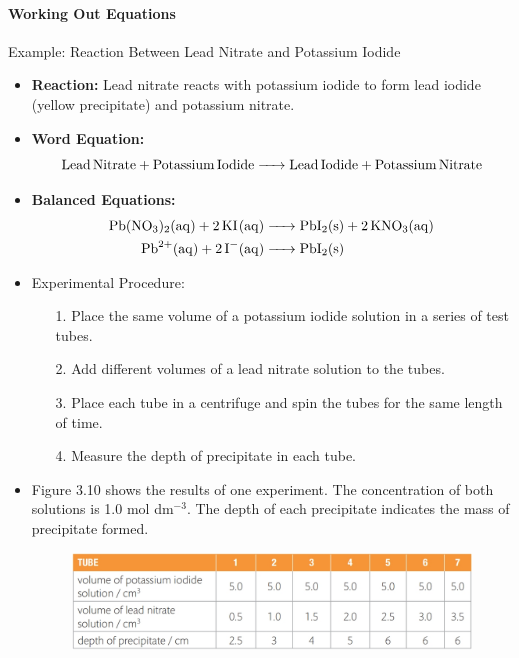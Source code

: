 \paragraph{Working Out Equations}
Example: Reaction Between Lead Nitrate and Potassium Iodide
\begin{itemize}
    \item \textbf{Reaction:} Lead nitrate reacts with potassium iodide to form lead iodide (yellow precipitate) and potassium
    nitrate.
    \item \textbf{Word Equation:}
    \begin{equation}
        \ce{Lead Nitrate + Potassium Iodide -> Lead Iodide + Potassium Nitrate}
    \end{equation}
    \item \textbf{Balanced Equations:}
    \begin{equation}
        \begin{split}
            \ce{Pb(NO3)2(aq) + 2KI(aq) &-> PbI2(s) + 2KNO3(aq)}\\
            \ce{Pb^2+(aq) + 2I-(aq) &-> PbI2(s)}
        \end{split}
    \end{equation}
    \item Experimental Procedure:
    \begin{itemize}
        \item[1.] Place the same volume of a potassium iodide solution in a series of test tubes.
        \item[2.] Add different volumes of a lead nitrate solution to the tubes.
        \item[3.] Place each tube in a centrifuge and spin the tubes for the same length of time.
        \item[4.] Measure the depth of precipitate in each tube.
    \end{itemize}
    \item Figure 3.10 shows the results of one experiment. The concentration of both solutions is 1.0 mol dm$^{-3}$. The depth
    of each precipitate indicates the mass of precipitate formed.
    \begin{figure}[H]
        \centering
        \includegraphics[scale=0.3]{Chemistry/1B/Images/1B-4-2.png}

\end{figure}
\end{itemize}
